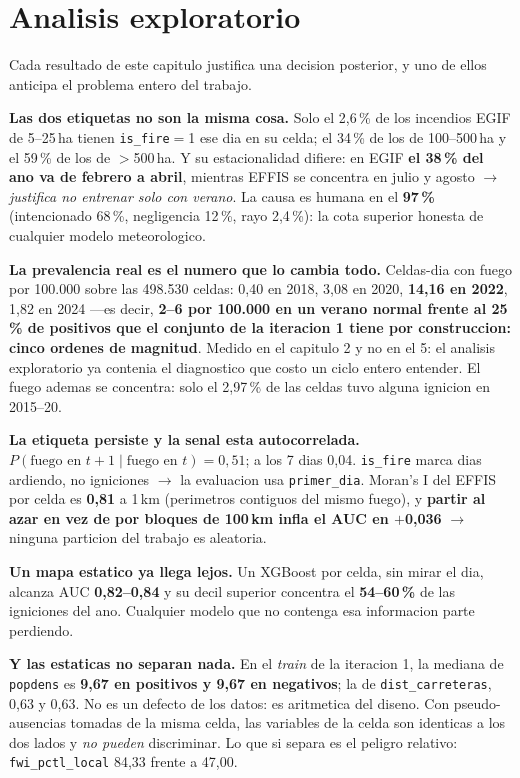 \documentclass[10pt,a4paper]{article}
\newcommand{\var}[1]{\texttt{\footnotesize #1}}
\begin{document}
\section{Analisis exploratorio}

Cada resultado de este capitulo justifica una decision posterior, y uno de ellos anticipa el
problema entero del trabajo.

\textbf{Las dos etiquetas no son la misma cosa.} Solo el 2,6\,\% de los incendios EGIF de
5--25\,ha tienen \var{is\_fire}$=$1 ese dia en su celda; el 34\,\% de los de 100--500\,ha y el
59\,\% de los de $>$500\,ha. Y su estacionalidad difiere: en EGIF \textbf{el 38\,\% del ano va de
febrero a abril}, mientras EFFIS se concentra en julio y agosto $\to$ \emph{justifica no entrenar
solo con verano}. La causa es humana en el \textbf{97\,\%} (intencionado 68\,\%, negligencia
12\,\%, rayo 2,4\,\%): la cota superior honesta de cualquier modelo meteorologico.

\textbf{La prevalencia real es el numero que lo cambia todo.} Celdas-dia con fuego por 100.000
sobre las 498.530 celdas: 0,40 en 2018, 3,08 en 2020, \textbf{14,16 en 2022}, 1,82 en 2024 ---es
decir, \textbf{2--6 por 100.000 en un verano normal frente al 25\,\% de positivos que el conjunto
de la iteracion 1 tiene por construccion: cinco ordenes de magnitud}. Medido en el capitulo 2 y no
en el 5: el analisis exploratorio ya contenia el diagnostico que costo un ciclo entero entender.
El fuego ademas se concentra: solo el 2,97\,\% de las celdas tuvo alguna ignicion en 2015--20.

\textbf{La etiqueta persiste y la senal esta autocorrelada.} $P(\text{fuego en }t{+}1\mid
\text{fuego en }t)=0{,}51$; a los 7 dias 0,04. \var{is\_fire} marca dias ardiendo, no igniciones
$\to$ la evaluacion usa \var{primer\_dia}. Moran's I del EFFIS por celda es \textbf{0,81} a 1\,km
(perimetros contiguos del mismo fuego), y \textbf{partir al azar en vez de por bloques de 100\,km
infla el AUC en $+$0,036} $\to$ ninguna particion del trabajo es aleatoria.

\textbf{Un mapa estatico ya llega lejos.} Un XGBoost por celda, sin mirar el dia, alcanza AUC
\textbf{0,82--0,84} y su decil superior concentra el \textbf{54--60\,\%} de las igniciones del ano.
Cualquier modelo que no contenga esa informacion parte perdiendo.

\textbf{Y las estaticas no separan nada.} En el \emph{train} de la iteracion 1, la mediana de
\var{popdens} es \textbf{9,67 en positivos y 9,67 en negativos}; la de \var{dist\_carreteras}, 0,63
y 0,63. No es un defecto de los datos: es aritmetica del diseno. Con pseudo-ausencias tomadas de la
misma celda, las variables de la celda son identicas a los dos lados y \emph{no pueden}
discriminar. Lo que si separa es el peligro relativo: \var{fwi\_pctl\_local} 84,33 frente a 47,00.
\end{document}
